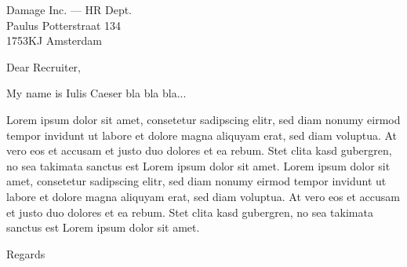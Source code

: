 \documentclass[standard]{scrlttr2}
\begin{document}
\begin{letter}{%
   Damage Inc. --- HR Dept.\\%
   Paulus Potterstraat 134\\%
   1753KJ Amsterdam
}

\opening{Dear Recruiter,}

My name is Iulis Caeser bla bla bla...

Lorem ipsum dolor sit amet, consetetur sadipscing elitr, sed diam nonumy eirmod tempor invidunt ut labore et dolore magna aliquyam erat, sed diam voluptua. At vero eos et accusam et justo duo dolores et ea rebum. Stet clita kasd gubergren, no sea takimata sanctus est Lorem ipsum dolor sit amet. Lorem ipsum dolor sit amet, consetetur sadipscing elitr, sed diam nonumy eirmod tempor invidunt ut labore et dolore magna aliquyam erat, sed diam voluptua. At vero eos et accusam et justo duo dolores et ea rebum. Stet clita kasd gubergren, no sea takimata sanctus est Lorem ipsum dolor sit amet.

\closing{Regards}


\end{letter}
\end{document}
